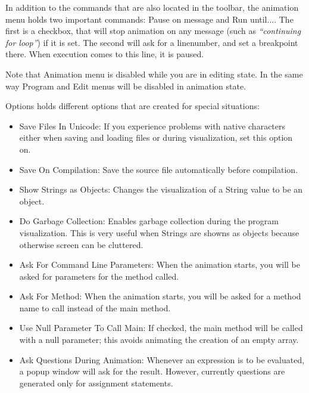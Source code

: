 \documentclass[a4paper,11pt,english]{article}
\newcommand{\bu}[1]{\textsf{#1}}
\newcommand{\menu}{\bu}
\begin{document}
{In addition to the commands that are also located in the toolbar, the \menu{animation} menu holds two important commands: \menu{Pause on message} and \menu{Run until...}. The first is a checkbox, that will stop animation on any message (such as \textit{``continuing for loop''}) if it is set. The second will ask for a linenumber, and set a breakpoint there. When execution comes to this line, it is paused.

Note that \menu{Animation} menu is disabled while you are in editing state. In the same way \menu{Program} and \menu{Edit} menus will be disabled in animation state. 

\menu{Options} holds different options that are created for special situations:
\begin{itemize}
\item \menu{Save Files In Unicode}: If you experience problems with native characters
either when saving and loading files or during visualization, set this option on.

\item \menu{Save On Compilation}: Save the source file automatically before compilation.

\item \menu{Show Strings as Objects}: Changes the visualization of a String value to be an object.

\item \menu{Do Garbage Collection}: Enables garbage collection during the program visualization.
This is very useful when Strings are showns as objects because otherwise screen can be cluttered.

\item \menu{Ask For Command Line Parameters}: When the animation starts, you will be asked
for parameters for the method called.

\item \menu{Ask For Method}: When the animation starts, you will be asked for a method name
to call instead of the main method.

\item \menu{Use Null Parameter To Call Main}: If checked, the main method will be called 
with a null parameter; this avoids animating the creation of an empty array.

\item \menu{Ask Questions During Animation}: Whenever an expression is to be evaluated, a 
popup window will ask for the result. However, currently questions are generated
only for assignment statements.


\end{itemize}}
\end{document}
